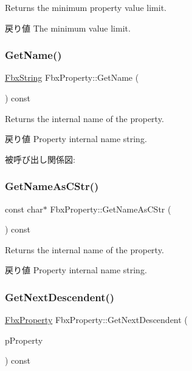 Returns the minimum property value limit. \begin{DoxyReturn}{戻り値}
The minimum value limit. 
\end{DoxyReturn}
\mbox{\label{class_fbx_property_ad4505c67d892b22bb40ba5e9c5b4a844}} 
\subsubsection{\texorpdfstring{Get\+Name()}{GetName()}}
{\footnotesize\ttfamily \hyperlink{class_fbx_string}{Fbx\+String} Fbx\+Property\+::\+Get\+Name (\begin{DoxyParamCaption}{ }\end{DoxyParamCaption}) const}

Returns the internal name of the property. \begin{DoxyReturn}{戻り値}
Property internal name string. 
\end{DoxyReturn}
被呼び出し関係図\+:
\mbox{\label{class_fbx_property_af2f3725b832d70596008f895950c2235}} 
\subsubsection{\texorpdfstring{Get\+Name\+As\+C\+Str()}{GetNameAsCStr()}}
{\footnotesize\ttfamily const char$\ast$ Fbx\+Property\+::\+Get\+Name\+As\+C\+Str (\begin{DoxyParamCaption}{ }\end{DoxyParamCaption}) const}

Returns the internal name of the property. \begin{DoxyReturn}{戻り値}
Property internal name string. 
\end{DoxyReturn}
\mbox{\label{class_fbx_property_a1de724032949fd7a7b21028894adbcce}} 
\subsubsection{\texorpdfstring{Get\+Next\+Descendent()}{GetNextDescendent()}}
{\footnotesize\ttfamily \hyperlink{class_fbx_property}{Fbx\+Property} Fbx\+Property\+::\+Get\+Next\+Descendent (\begin{DoxyParamCaption}\item[{const \hyperlink{class_fbx_property}{Fbx\+Property} \&}]{p\+Property }\end{DoxyParamCaption}) const}

